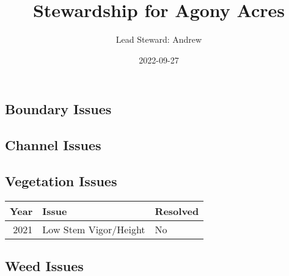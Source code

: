 \documentclass[
  landscape]{article}
\title{Stewardship for Agony Acres}
\author{Lead Steward: Andrew}
\date{2022-09-27}
\begin{document}
\maketitle

\hypertarget{boundary-issues}{%
\subsection{Boundary Issues}\label{boundary-issues}}

\textbar\textbar{} \textbar\textbar{} \textbar\textbar{}
\textbar\textbar{}

\hypertarget{channel-issues}{%
\subsection{Channel Issues}\label{channel-issues}}

\textbar\textbar{} \textbar\textbar{} \textbar\textbar{}
\textbar\textbar{}

\newpage

\hypertarget{vegetation-issues}{%
\subsection{Vegetation Issues}\label{vegetation-issues}}

\begin{longtable}[]{@{}rll@{}}
\toprule()
Year & Issue & Resolved \\
\midrule()
\endhead
2021 & Low Stem Vigor/Height & No \\
\bottomrule()
\end{longtable}

\newpage

\hypertarget{weed-issues}{%
\subsection{Weed Issues}\label{weed-issues}}
\end{document}
